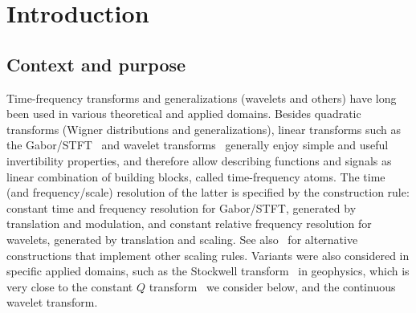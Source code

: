 \section{Introduction}\label{sec_intro}

\subsection{Context and purpose}

Time-frequency transforms and generalizations (wavelets and others) have long been used in various theoretical and applied domains. Besides quadratic transforms (Wigner distributions and generalizations), linear transforms such as the Gabor/STFT~\cite{daubechies1992ten,grochenig2013foundations} and wavelet transforms~\cite{Grossmann1984decomposition,daubechies1992ten,mallat2008wavelet,meyer1993wavelets} generally enjoy simple and useful invertibility properties, and therefore allow describing functions and signals as linear combination of building blocks, called time-frequency atoms. The time (and frequency/scale) resolution of the latter is specified by the construction rule: constant time and frequency resolution for Gabor/STFT, generated by translation and modulation, and constant relative frequency resolution for wavelets, generated by translation and scaling. See also~\cite{Kalisa1993weyl,Ali2000coherent,Fornasier2007banach} for alternative constructions that implement other scaling rules. Variants were also considered in specific applied domains, such as the Stockwell transform~\cite{Stockwell1996localization} in geophysics, which is very close to the constant $Q$ transform~\cite{Brown1991calculation,velasco2011constructing} we consider below, and the continuous wavelet transform.

